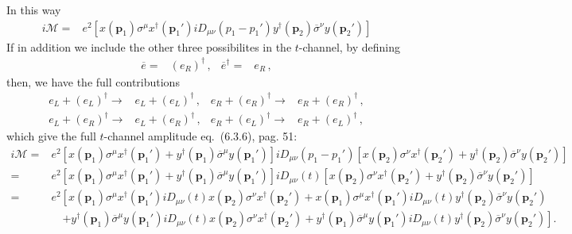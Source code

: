 In this way %
\begin{align}
  i\mathcal{M}=&e^2\left[ x(\mathbf{p}_1) {\sigma}^{\mu}x^{\dagger}(\mathbf{p}_1')  i D_{\mu\nu}\left( p_1-p_1' \right)y^{\dagger}(\mathbf{p}_2) \overline{\sigma}^{\nu} y(\mathbf{p}_2')\right]
\end{align}
If in addition we include the other three possibilites in the $t$-channel, by defining
\begin{align}
 \overline{e}=&\left( e_R \right)^{\dagger}\,, & \overline{e}^{\dagger}=&e_R\,,
\end{align}
then, we have the full contributions
\begin{align}
 e_L+\left( e_L \right)^{\dagger} \to &  e_L+\left( e_L \right)^{\dagger}\,, & e_R+\left( e_R \right)^{\dagger} \to &  e_R+\left( e_R \right)^{\dagger}\,, \nonumber\\
  e_L+\left( e_R \right)^{\dagger}\to &  e_L+\left( e_R \right)^{\dagger}\,, &  e_R+\left( e_L \right)^{\dagger}\to & e_R+\left( e_L \right)^{\dagger} \,,
\end{align}
which give the full $t$-channel amplitude \cite{Dreiner:2008tw} eq.~(6.3.6), pag. 51:
\begin{align}
   i\mathcal{M}=&e^2\left[ x(\mathbf{p}_1) {\sigma}^{\mu}x^{\dagger}(\mathbf{p}_1') + y^{\dagger}(\mathbf{p}_1) \overline{\sigma}^{\mu} y(\mathbf{p}_1')\right]i D_{\mu\nu}\left( p_1-p_1' \right)\left[ x(\mathbf{p}_2) {\sigma}^{\nu}x^{\dagger}(\mathbf{p}_2') + y^{\dagger}(\mathbf{p}_2) \overline{\sigma}^{\nu} y(\mathbf{p}_2')  \right]\nonumber\\
=&e^2\left[ x(\mathbf{p}_1) {\sigma}^{\mu}x^{\dagger}(\mathbf{p}_1') + y^{\dagger}(\mathbf{p}_1) \overline{\sigma}^{\mu} y(\mathbf{p}_1')\right]i D_{\mu\nu}(t)\left[ x(\mathbf{p}_2) {\sigma}^{\nu}x^{\dagger}(\mathbf{p}_2') + y^{\dagger}(\mathbf{p}_2) \overline{\sigma}^{\nu} y(\mathbf{p}_2')  \right]\nonumber\\
=&e^2\left[ x(\mathbf{p}_1) {\sigma}^{\mu}x^{\dagger}(\mathbf{p}_1')i D_{\mu\nu}(t)x(\mathbf{p}_2) {\sigma}^{\nu}x^{\dagger}(\mathbf{p}_2')+x(\mathbf{p}_1) {\sigma}^{\mu}x^{\dagger}(\mathbf{p}_1')i D_{\mu\nu}(t)y^{\dagger}(\mathbf{p}_2) \overline{\sigma}^{\nu} y(\mathbf{p}_2') \right.   \nonumber\\
&\quad \left.+ y^{\dagger}(\mathbf{p}_1) \overline{\sigma}^{\mu} y(\mathbf{p}_1')i D_{\mu\nu}(t)x(\mathbf{p}_2) {\sigma}^{\nu}x^{\dagger}(\mathbf{p}_2') +
y^{\dagger}(\mathbf{p}_1) \overline{\sigma}^{\mu} y(\mathbf{p}_1')i D_{\mu\nu}(t)y^{\dagger}(\mathbf{p}_2) \overline{\sigma}^{\nu} y(\mathbf{p}_2')\right].
\end{align}
